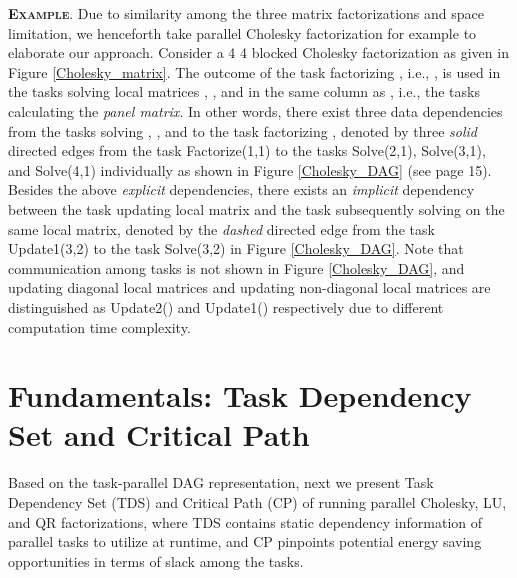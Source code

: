 \documentclass[12pt]{elsarticle}
\begin{document}
\vspace{1mm}
\noindent\textsc{\textbf{Example}}. Due to similarity among the three matrix factorizations and space limitation, we henceforth take parallel Cholesky factorization for example to elaborate our approach. Consider a 4  4 blocked Cholesky factorization as given in Figure \ref{Cholesky_matrix}. The outcome of the task factorizing , i.e., , is used in the tasks solving local matrices , , and  in the same column as , i.e., the tasks calculating the \emph{panel matrix}. In other words, there exist three data dependencies from the tasks solving , , and  to the task factorizing , denoted by three \emph{solid} directed edges from the task \textsf{Factorize(1,1)} to the tasks \textsf{Solve(2,1)}, \textsf{Solve(3,1)}, and \textsf{Solve(4,1)} individually as shown in Figure \ref{Cholesky_DAG} (see page 15). Besides the above \emph{explicit} dependencies, there exists an \emph{implicit} dependency between the task updating local matrix  and the task subsequently solving  on the same local matrix, denoted by the \emph{dashed} directed edge from the task \textsf{Update1(3,2)} to the task \textsf{Solve(3,2)} in Figure \ref{Cholesky_DAG}. Note that communication among tasks is not shown in Figure \ref{Cholesky_DAG}, and updating diagonal local matrices and updating non-diagonal local matrices are distinguished as \textsf{Update2()} and \textsf{Update1()} respectively due to different computation time complexity.


\section{Fundamentals: Task Dependency Set and Critical Path}

Based on the task-parallel DAG representation, next we present Task Dependency Set (TDS) and Critical Path (CP) of running parallel Cholesky, LU, and QR factorizations, where TDS contains static dependency information of parallel tasks to utilize at runtime, and CP pinpoints potential energy saving opportunities in terms of slack among the tasks.
\end{document}
